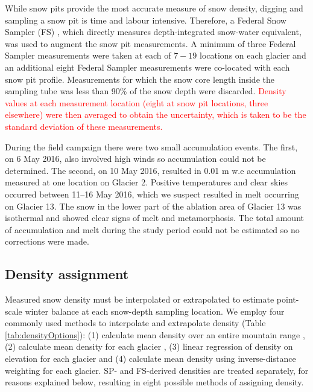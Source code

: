 \documentclass[twocolumn, letterpaper]{igs}
\begin{document}
While snow pits provide the most accurate measure of snow density, digging and sampling a snow pit is time and labour intensive. Therefore, a Federal Snow Sampler (FS) \citep{Clyde1932}, which directly measures depth-integrated snow-water equivalent, was used to augment the snow pit measurements. A minimum of three Federal Sampler measurements were taken at each of $7-19$ locations on each glacier and an additional eight Federal Sampler measurements were co-located with each snow pit profile. Measurements for which the snow core length inside the sampling tube was less than 90\% of the snow depth were discarded. \textcolor{red}{Density values at each measurement location (eight at snow pit locations, three elsewhere) were then averaged to obtain the uncertainty, which is taken to be the standard deviation of these measurements.}

During the field campaign there were two small accumulation events. The first, on 6 May 2016, also involved high winds so accumulation could not be determined. The second, on 10 May 2016, resulted in 0.01 m w.e accumulation measured at one location on Glacier 2. Positive temperatures and clear skies occurred between 11--16 May 2016, which we suspect resulted in melt occurring on Glacier 13. The snow in the lower part of the ablation area of Glacier 13 was isothermal and showed clear signs of melt and metamorphosis. The total amount of accumulation and melt during the study period could not be estimated so no corrections were made. 

\subsection{Density assignment}

Measured snow density must be interpolated or extrapolated to estimate point-scale winter balance at each snow-depth sampling location. We employ four commonly used methods to interpolate and extrapolate density (Table \ref{tab:densityOptions}): (1) calculate mean density over an entire mountain range \citep[e.g.][]{Cullen2017}, (2) calculate mean density for each glacier \citep[e.g.][]{Elder1991, McGrath2015}, (3) linear regression of density on elevation for each glacier \citep[e.g.][]{Elder1998, Molotch2005} and (4) calculate mean density using inverse-distance weighting \citep[e.g.][]{Molotch2005} for each glacier.  SP- and FS-derived densities are treated separately, for reasons explained below, resulting in eight possible methods of assigning density.
\end{document}
